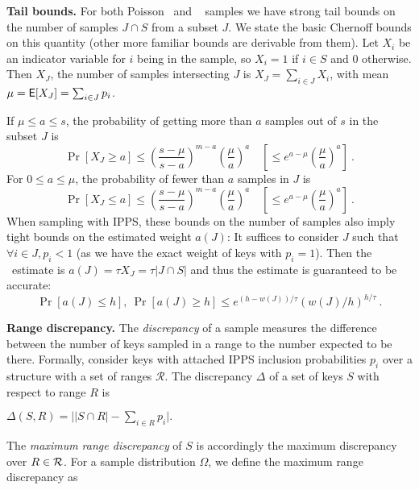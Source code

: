 \documentclass[11pt]{article}
\begin{document}
\noindent
{\bf Tail bounds.}
  For both Poisson~\cite{Chernoff} and \varopt~\cite{PancSri:sicomp97,Sri01,GandhiKPS:jacm06,varopt_full:CDKLT10} samples we have
strong tail bounds on the number of samples $J\cap S$ from a subset $J$.
We state the basic Chernoff bounds on this quantity
(other more familiar bounds are derivable from them).
Let $X_i$ be an indicator variable for $i$ being in the sample, so
$X_i = 1$ if $i\in S$ and $0$ otherwise.
Then $X_J$, the number of samples intersecting $J$ is
$X_J=\sum_{i\in J} X_i$, with mean 
  $\mu = \textsf{E}[X_J]=\sum_{i\in J} p_i$. 

If $\mu \leq a\leq s$, 
the probability of getting more than $a$ samples out of $s$ 
in the subset $J$ is
\begin{equation} \label{chernoff:upper}
\Pr[X_J \ge a] \leq
\left(\frac{s-\mu}{s-a}\right)^{m-a}\left(\frac{\mu}{a}\right)^a
\quad 
\left[\leq
e^{a-\mu}\left(\frac{\mu}{a}\right)^a
\right]\ .
\end{equation}
For $0 \leq a\leq\mu$, the probability of fewer than $a$
samples in $J$ is 
\begin{equation} \label{chernoff:lower}
\Pr[X_J \le a] \leq
\left(\frac{s-\mu}{s-a}\right)^{m-a}\left(\frac{\mu}{a}\right)^a
\quad 
\left[\leq
e^{a-\mu}\left(\frac{\mu}{a}\right)^a
\right]\ .
\end{equation}
\noindent
When sampling with IPPS, 
these bounds on the number of samples also imply tight bounds
on the estimated weight $a(J)$: 
It suffices to consider $J$ such that $\forall i\in J, p_i<1$ 
(as we have the exact weight of keys
with $p_i=1$).  
Then
the \HT\ estimate is
$a(J)= \tau X_J= \tau |J\cap S|$ and thus 
the estimate is guaranteed to be accurate:
\begin{equation} \label{chernoffw:bounds}
\Pr[a(J) \le h],\ \Pr[a(J) \ge h] \leq
e^{(h-w(J))/\tau}(w(J)/h)^{h/\tau}
\ .
\end{equation}

\noindent
{\bf Range discrepancy.}
The {\em discrepancy} of a sample measures the difference between the
number of keys sampled in a range to the number expected to be there. 
Formally, consider keys with attached IPPS inclusion probabilities
$p_i$ over a structure with a set of ranges $\mathcal{R}$. 
The discrepancy $\Delta$ of a set of keys $S$ with respect to range $R$ is

\smallskip
\centerline{$
\Delta(S,R)=\big| |S\cap R| - \sum_{i\in R} p_i \big| .$}

\smallskip
The {\em maximum range discrepancy} of $S$ is accordingly the maximum
discrepancy over $R\in \mathcal{R}$.
For a sample distribution $\Omega$, we define the
maximum range discrepancy as
\end{document}
